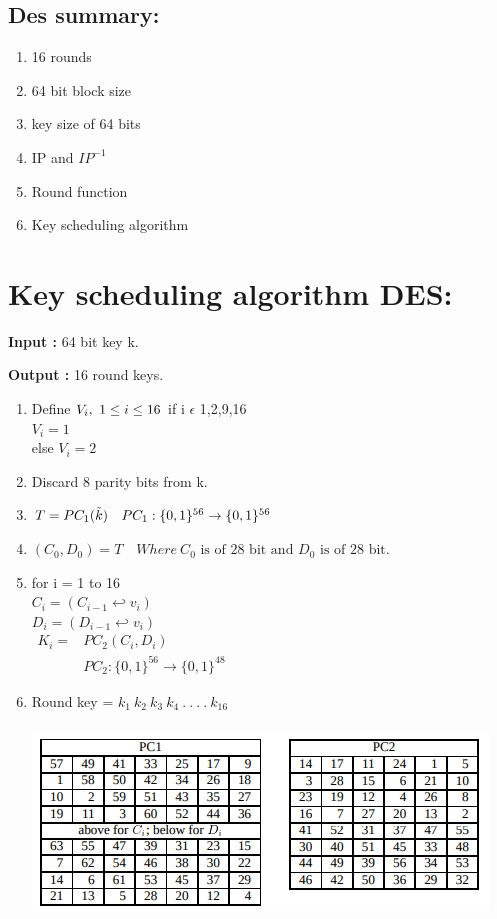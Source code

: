 \documentclass[11pt]{article}
\begin{document}
\subsection{Des summary:}
\begin{enumerate}
    \item 16 rounds
    \item 64 bit block size
    \item key size of 64 bits
    \item IP and $IP^{-1}$
    \item Round function 
    \item Key scheduling algorithm
\end{enumerate}

\newpage
\section{Key scheduling algorithm DES:}

\textbf{Input :} 64 bit key k.

\textbf{Output :} 16 round keys.

\begin{enumerate}
    \item Define $V_i,\ 1 \le i \le 16\\$
    if i $\epsilon$ {1,2,9,16}\\
    {$V_i=1$}\\
    else $V_i = 2$
    \item Discard 8 parity bits from k.
    \item $T = PC_1(\Tilde{k})\quad PC_1 : \{0,1\}^{56} \rightarrow \{0,1\}^{56} $
    \item $(C_0,D_0)=T \quad Where\ C_0 \text{ is of 28 bit and } D_0 \text{ is of 28 bit.}$
    \item for i = 1 to 16\\
    $C_i = (C_{i-1} \hookleftarrow v_i)$\\
    $D_i = (D_{i-1} \hookleftarrow v_i)$\\
    
    $\begin{aligned}
    K_i = & PC_2 (C_i,D_i)\\
    & PC_2 : \{0,1\}^{56} \rightarrow \{0,1\}^{48}    
    \end{aligned}$
    \item Round key = $k_1\ k_2\ k_3\ k_4 \ .\ .\ .\ .\ k_{16}$\\\\
    \includegraphics[scale=1.4]{Images/L_5-6/DES PC_1-PC_2.png}\\
    
\end{enumerate}
\end{document}
